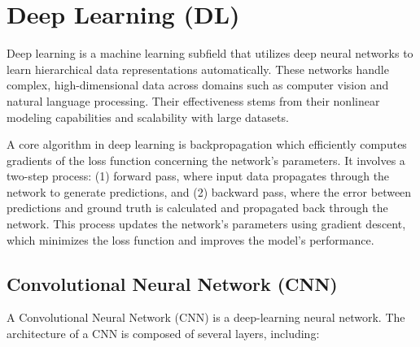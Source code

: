 



\section{Deep Learning (DL)}

Deep learning is a machine learning subfield that utilizes deep neural networks to learn hierarchical data representations automatically. These networks handle complex, high-dimensional data across domains such as computer vision and natural language processing. Their effectiveness stems from their nonlinear modeling capabilities and scalability with large datasets.

A core algorithm in deep learning is backpropagation which efficiently computes gradients of the loss function concerning the network's parameters. It involves a two-step process: (1) forward pass, where input data propagates through the network to generate predictions, and (2) backward pass, where the error between predictions and ground truth is calculated and propagated back through the network. This process updates the network's parameters using gradient descent, which minimizes the loss function and improves the model's performance.



\subsection{Convolutional Neural Network (CNN)}

A Convolutional Neural Network (CNN) is a deep-learning neural network. The architecture of a CNN is composed of several layers, including:

